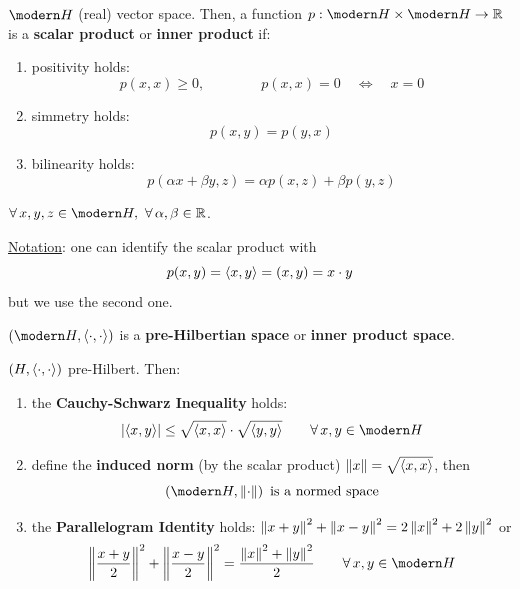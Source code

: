\begin{defn}
$\Hc$ (real) vector space. Then, a function $p:\Hc\times \Hc\to\RR$ is a \textbf{scalar product} or \textbf{inner product} if:
\begin{enumerate}
\item positivity holds:
\begin{equation*}
    p(x,x)\geq 0,\qquad\qquad p(x,x)=0\quad \Longleftrightarrow\quad x=0
\end{equation*}

\item simmetry holds:
\begin{equation*}
    p(x,y)=p(y,x)
\end{equation*}

\item bilinearity holds:
\begin{equation*}
    p(\alpha x +\beta y, z)=\alpha p(x,z)+ \beta p(y,z)
\end{equation*}
\end{enumerate}
$\forall x,y,z\in \Hc,\ \forall \alpha,\beta\in\RR$. 
\end{defn}

\underline{Notation}: one can identify the scalar product with
\begin{equation*}
    p(x,y)=\left\langle x,y \right\rangle=(x,y)=x\cdot y
\end{equation*}
but we use the second one.

\begin{defn}
$\left( \Hc,\sca{\cdot,\cdot} \right)$ is a \textbf{pre-Hilbertian space} or \textbf{inner product space}.
\end{defn}

\begin{proposition}
$\left( H,\left\langle \cdot,\cdot \right\rangle \right)$ pre-Hilbert. Then:
\begin{enumerate}
\item the \textbf{Cauchy-Schwarz Inequality} holds:
\begin{equation*}
    \abs{\sca{x,y}}\leq \sqrt{\sca{x,x}}\cdot\sqrt{\sca{y,y}}\qquad \forall x,y\in \Hc
\end{equation*}

\item define the \textbf{induced norm} (by the scalar product) $\left\lVert x \right\rVert=\sqrt{\left\langle x,x \right\rangle}$, then
\begin{equation*}
    \left( \Hc,\norm{\cdot} \right)\text{ is a normed space}
\end{equation*}

\item the \textbf{Parallelogram Identity} holds: $\left\lVert x+y \right\rVert^2+\left\lVert x-y \right\rVert^2=2\left\lVert x \right\rVert^2+2\left\lVert y \right\rVert^2$ or
\begin{equation*}
\norm{\frac{x+y}{2}}^2+\norm{\frac{x-y}{2}}^2=\frac{\norm{x}^2+\norm{y}^2}{2} \qquad\forall x,y\in \Hc
\end{equation*}
\end{enumerate}
\end{proposition}

